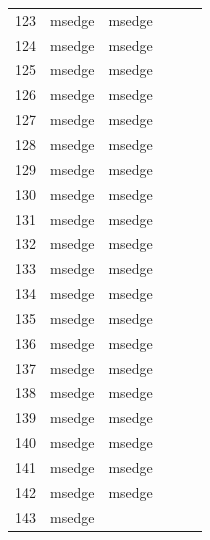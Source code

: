 \documentclass[a4paper,twoside,12pt]{book}
\begin{document}
\begin{appendices}
\begin{table}
\begin{tabular}{llllll}
		123 &  msedge &         msedge &                &                &                \\
		124 &  msedge &         msedge &                &                &                \\
		125 &  msedge &         msedge &                &                &                \\
		126 &  msedge &         msedge &                &                &                \\
		127 &  msedge &         msedge &                &                &                \\
		128 &  msedge &         msedge &                &                &                \\
		129 &  msedge &         msedge &                &                &                \\
		130 &  msedge &         msedge &                &                &                \\
		131 &  msedge &         msedge &                &                &                \\
		132 &  msedge &         msedge &                &                &                \\
		133 &  msedge &         msedge &                &                &                \\
		134 &  msedge &         msedge &                &                &                \\
		135 &  msedge &         msedge &                &                &                \\
		136 &  msedge &         msedge &                &                &                \\
		137 &  msedge &         msedge &                &                &                \\
		138 &  msedge &         msedge &                &                &                \\
		139 &  msedge &         msedge &                &                &                \\
		140 &  msedge &         msedge &                &                &                \\
		141 &  msedge &         msedge &                &                &                \\
		142 &  msedge &         msedge &                &                &                \\
		143 &  msedge &                &                &                &                \\

\end{tabular}
\end{table}
\end{appendices}
\end{document}
